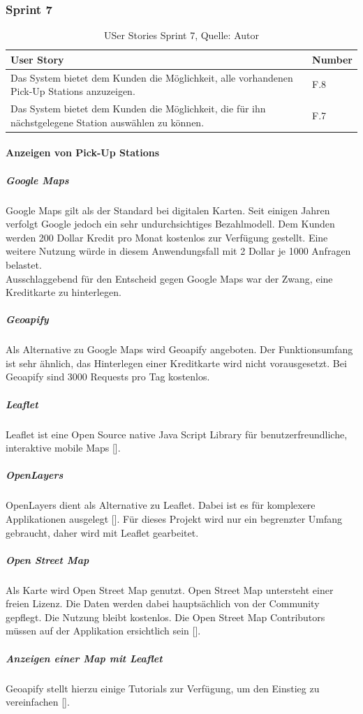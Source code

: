 \subsubsection{Sprint 7}
\begin{table}[H]
	\setlength\extrarowheight{2pt} %
	\begin{tabularx}{\textwidth}{|X|l|}
		\hline
		\textbf{User Story} & \textbf{Number} \\
		\hline
		Das System bietet dem Kunden die Möglichkeit, alle vorhandenen Pick-Up Stations anzuzeigen. & F.8\\
		\hline
		Das System bietet dem Kunden die Möglichkeit, die für ihn nächstgelegene Station auswählen zu können. & F.7\\
		\hline
	\end{tabularx} 
	\caption[User Stories Sprint 7]{USer Stories Sprint 7, Quelle: Autor}
\end{table}\label{userStoriesSprint7}
\paragraph{Anzeigen von Pick-Up Stations}
\subparagraph{Google Maps}
Google Maps gilt als der Standard bei digitalen Karten. Seit einigen Jahren verfolgt Google jedoch ein sehr undurchsichtiges Bezahlmodell. Dem Kunden werden 200 Dollar Kredit pro Monat kostenlos zur Verfügung gestellt. Eine weitere Nutzung würde in diesem Anwendungsfall mit 2 Dollar je 1000 Anfragen belastet. \\
Ausschlaggebend für den Entscheid gegen Google Maps war der Zwang, eine Kreditkarte zu hinterlegen. 
\subparagraph{Geoapify}
Als Alternative zu Google Maps wird Geoapify angeboten. Der Funktionsumfang ist sehr ähnlich, das Hinterlegen einer Kreditkarte wird nicht vorausgesetzt. Bei Geoapify sind 3000 Requests pro Tag kostenlos. 
\subparagraph{Leaflet}
Leaflet ist eine Open Source native Java Script Library für benutzerfreundliche, interaktive mobile Maps [\cite{leaflet}]. 
\subparagraph{OpenLayers}
OpenLayers dient als Alternative zu Leaflet. Dabei ist es für komplexere Applikationen ausgelegt [\cite{leafletVsOpenlayers}]. 
Für dieses Projekt wird nur ein begrenzter Umfang gebraucht, daher wird mit Leaflet gearbeitet. 

\subparagraph{Open Street Map}
Als Karte wird Open Street Map genutzt. Open Street Map untersteht einer freien Lizenz. Die Daten werden dabei hauptsächlich von der Community gepflegt. Die Nutzung bleibt kostenlos. Die Open Street Map Contributors müssen auf der Applikation ersichtlich sein [\cite{openStreetMap}].  
\subparagraph{Anzeigen einer Map mit Leaflet}
Geoapify stellt hierzu einige Tutorials zur Verfügung, um den Einstieg zu vereinfachen [\cite{geoapifyLeaflet}].  

